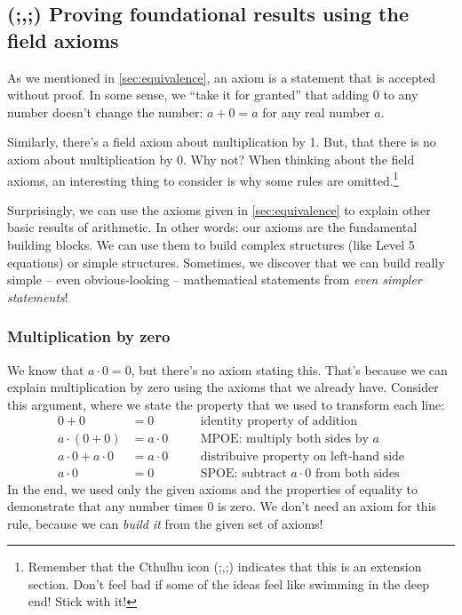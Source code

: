 
\subsection{(;,;) Proving foundational results using the field axioms}

As we mentioned in \cref{sec:equivalence}, an axiom is a statement that is accepted without proof. In some sense, we ``take it for granted'' that adding 0 to any number doesn't change the number: $a+0 = a$ for any real number $a$.

Similarly, there's a field axiom about multiplication by 1. But, that there is no axiom about multiplication by 0. Why not? When thinking about the field axioms, an interesting thing to consider is why some rules are omitted.\footnote{Remember that the Cthulhu icon (;,;) indicates that this is an extension section. Don't feel bad if some of the ideas feel like swimming in the deep end! Stick with it!}

Surprisingly, we can use the axioms given in \cref{sec:equivalence} to explain other basic results of arithmetic. In other words: our axioms are the fundamental building blocks. We can use them to build complex structures (like Level 5 equations) or simple structures. Sometimes, we discover that we can build really simple -- even obvious-looking -- mathematical statements from \textit{even simpler statements}!

\subsubsection{Multiplication by zero}

We know that $a \cdot 0 = 0$, but there's no axiom stating this. That's because we can explain multiplication by zero using the axioms that we already have. Consider this argument, where we state the property that we used to transform each line:
\[\begin{aligned}
0 + 0 &= 0
&& \quad\text{identity property of addition}
\\
a\cdot(0+0) &= a\cdot0
&& \quad\text{MPOE: multiply both sides by $a$}
\\
a\cdot0 + a\cdot0 &= a\cdot0
&& \quad\text{distribuive property on left-hand side}
\\
a\cdot0 &= 0
&& \quad\text{SPOE: subtract $a\cdot0$ from both sides}
\end{aligned}\]
In the end, we used only the given axioms and the properties of equality to demonstrate that any number times 0 is zero. We don't need an axiom for this rule, because we can \textit{build it} from the given set of axioms!

